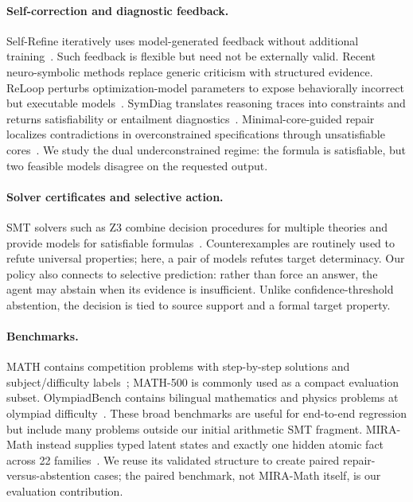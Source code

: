 \documentclass[sigconf,anonymous]{aamas}
\begin{document}
\paragraph{Self-correction and diagnostic feedback.}
Self-Refine iteratively uses model-generated feedback without additional training~\cite{madaan2023selfrefine}.  Such feedback is flexible but need not be externally valid.  Recent neuro-symbolic methods replace generic criticism with structured evidence.  ReLoop perturbs optimization-model parameters to expose behaviorally incorrect but executable models~\cite{lian2026reloop}.  SymDiag translates reasoning traces into constraints and returns satisfiability or entailment diagnostics~\cite{cui2026symdiag}.  Minimal-core-guided repair localizes contradictions in overconstrained specifications through unsatisfiable cores~\cite{sarkar2026cores}.  We study the dual underconstrained regime: the formula is satisfiable, but two feasible models disagree on the requested output.

\paragraph{Solver certificates and selective action.}
SMT solvers such as Z3 combine decision procedures for multiple theories and provide models for satisfiable formulas~\cite{demoura2008z3}.  Counterexamples are routinely used to refute universal properties; here, a pair of models refutes target determinacy.  Our policy also connects to selective prediction: rather than force an answer, the agent may abstain when its evidence is insufficient.  Unlike confidence-threshold abstention, the decision is tied to source support and a formal target property.

\paragraph{Benchmarks.}
MATH contains competition problems with step-by-step solutions and subject/difficulty labels~\cite{hendrycks2021math}; MATH-500 is commonly used as a compact evaluation subset.  OlympiadBench contains bilingual mathematics and physics problems at olympiad difficulty~\cite{he2024olympiadbench}.  These broad benchmarks are useful for end-to-end regression but include many problems outside our initial arithmetic SMT fragment.  MIRA-Math instead supplies typed latent states and exactly one hidden atomic fact across 22 families~\cite{albateh2026mira}.  We reuse its validated structure to create paired repair-versus-abstention cases; the paired benchmark, not MIRA-Math itself, is our evaluation contribution.
\end{document}
